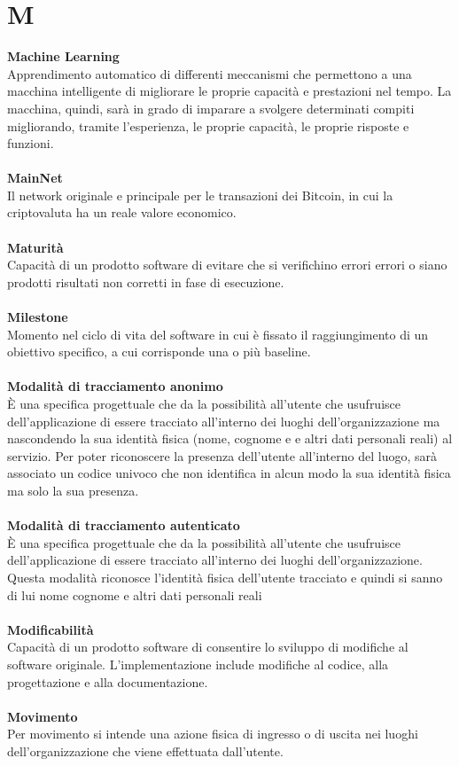 \section{M}
\textbf{Machine Learning}\\
Apprendimento automatico di differenti meccanismi che permettono a una macchina intelligente di migliorare le proprie capacità e prestazioni nel tempo. La macchina, quindi, sarà in grado di imparare a svolgere determinati compiti migliorando, tramite l’esperienza, le proprie capacità, le proprie risposte e funzioni. \\ \\
\textbf{MainNet}\\
Il network originale e principale per le transazioni dei Bitcoin, in cui la criptovaluta ha un reale valore economico. \\ \\
\textbf{Maturità}\\
Capacità di un prodotto software di evitare che si verifichino errori errori o siano prodotti risultati non corretti in fase di esecuzione. \\ \\
\textbf{Milestone}\\
Momento nel ciclo di vita del software in cui è fissato il raggiungimento di un obiettivo specifico, a cui corrisponde una o più baseline.\\ \\
\textbf{Modalità di tracciamento anonimo}\\
È una specifica progettuale che da la possibilità all’utente che usufruisce dell’applicazione di essere tracciato all'interno dei luoghi dell'organizzazione ma nascondendo la sua identità fisica (nome, cognome e e altri dati personali reali) al servizio. Per poter riconoscere la presenza dell'utente all'interno del luogo, sarà associato un codice univoco che non identifica in alcun modo la sua identità fisica ma solo la sua presenza.\\ \\
\textbf{Modalità di tracciamento autenticato}\\
È una specifica progettuale che da la possibilità all’utente che usufruisce dell’applicazione di essere tracciato all'interno dei luoghi dell'organizzazione. Questa modalità riconosce l'identità fisica dell'utente tracciato e quindi si sanno di lui nome cognome e altri dati personali reali \\ \\
\textbf{Modificabilità}\\
Capacità di un prodotto software di consentire lo sviluppo di modifiche al software originale. L'implementazione include modifiche al codice, alla progettazione e alla documentazione.\\ \\
\textbf{Movimento}\\
Per movimento si intende una azione fisica di ingresso o di uscita nei luoghi dell'organizzazione che viene effettuata dall'utente. \\ \\
\clearpage
